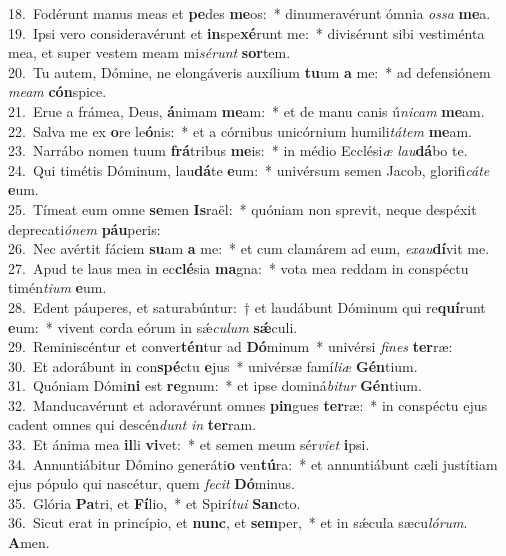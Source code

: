 {18.~}Fodérunt manus meas et \textbf{pe}des \textbf{me}os:~* dinumeravérunt ómnia \textit{os}\textit{sa} \textbf{me}a.\\
{19.~}Ipsi vero consideravérunt et \textbf{in}spe\textbf{xé}runt me:~* divisérunt sibi vestiménta mea, et super vestem meam mi\textit{sé}\textit{runt} \textbf{sor}tem.\\
{20.~}Tu autem, Dómine, ne elongáveris auxílium \textbf{tu}um \textbf{a} me:~* ad defensiónem \textit{me}\textit{am} \textbf{cón}spice.\\
{21.~}Erue a frámea, Deus, \textbf{á}nimam \textbf{me}am:~* et de manu canis ú\textit{ni}\textit{cam} \textbf{me}am.\\
{22.~}Salva me ex \textbf{o}re le\textbf{ó}nis:~* et a córnibus unicórnium humili\textit{tá}\textit{tem} \textbf{me}am.\\
{23.~}Narrábo nomen tuum \textbf{frá}tribus \textbf{me}is:~* in médio Ecclési\textit{æ} \textit{lau}\textbf{dá}bo te.\\
{24.~}Qui timétis Dóminum, lau\textbf{dá}te \textbf{e}um:~* univérsum semen Jacob, glorifi\textit{cá}\textit{te} \textbf{e}um.\\
{25.~}Tímeat eum omne \textbf{se}men \textbf{Is}raël:~* quóniam non sprevit, neque despéxit deprecati\textit{ó}\textit{nem} \textbf{páu}peris:\\
{26.~}Nec avértit fáciem \textbf{su}am \textbf{a} me:~* et cum clamárem ad eum, \textit{e}\textit{xau}\textbf{dí}vit me.\\
{27.~}Apud te laus mea in ec\textbf{clé}sia \textbf{ma}gna:~* vota mea reddam in conspéctu timén\textit{ti}\textit{um} \textbf{e}um.\\
{28.~}Edent páuperes, et saturabúntur:~† et laudábunt Dóminum qui re\textbf{quí}runt \textbf{e}um:~* vivent corda eórum in sǽ\textit{cu}\textit{lum} \textbf{sǽ}culi.\\
{29.~}Reminiscéntur et conver\textbf{tén}tur ad \textbf{Dó}minum~* univérsi \textit{fi}\textit{nes} \textbf{ter}ræ:\\
{30.~}Et adorábunt in con\textbf{spé}ctu \textbf{e}jus~* univérsæ famí\textit{li}\textit{æ} \textbf{Gén}tium.\\
{31.~}Quóniam Dómi\textbf{ni} est \textbf{re}gnum:~* et ipse dominá\textit{bi}\textit{tur} \textbf{Gén}tium.\\
{32.~}Manducavérunt et adoravérunt omnes \textbf{pin}gues \textbf{ter}ræ:~* in conspéctu ejus cadent omnes qui descén\textit{dunt} \textit{in} \textbf{ter}ram.\\
{33.~}Et ánima mea \textbf{il}li \textbf{vi}vet:~* et semen meum sér\textit{vi}\textit{et} \textbf{i}psi.\\
{34.~}Annuntiábitur Dómino generáti\textbf{o} ven\textbf{tú}ra:~* et annuntiábunt cæli justítiam ejus pópulo qui nascétur, quem \textit{fe}\textit{cit} \textbf{Dó}minus.\\
{35.~}Glória \textbf{Pa}tri, et \textbf{Fí}lio,~* et Spirí\textit{tu}\textit{i} \textbf{San}cto.\\
{36.~}Sicut erat in princípio, et \textbf{nunc}, et \textbf{sem}per,~* et in sǽcula sæcu\textit{ló}\textit{rum}. \textbf{A}men.\\
